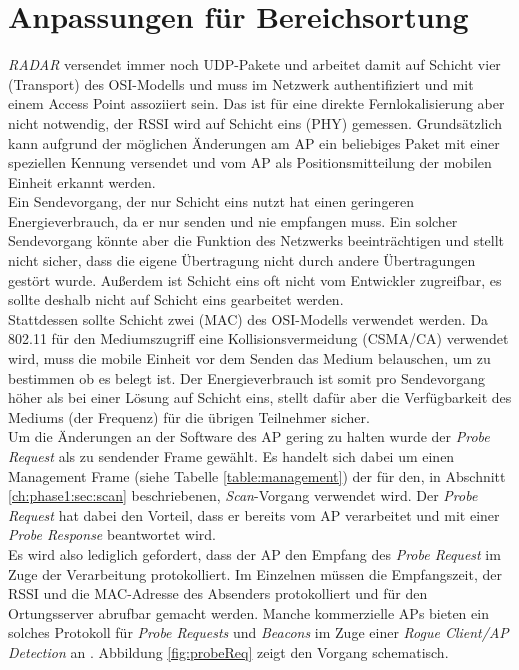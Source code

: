 \section{Anpassungen für Bereichsortung}
\label{ch:phase2:sec:anpassungbereich}
\emph{RADAR} versendet immer noch UDP-Pakete und arbeitet damit auf Schicht vier (Transport) des OSI-Modells und muss im Netzwerk authentifiziert und mit einem Access Point assoziiert sein.
Das ist für eine direkte Fernlokalisierung aber nicht notwendig, der RSSI wird auf Schicht eins (PHY) gemessen.
Grundsätzlich kann aufgrund der möglichen Änderungen am AP ein beliebiges Paket mit einer speziellen Kennung versendet und vom AP als Positionsmitteilung der mobilen Einheit erkannt werden. \\
Ein Sendevorgang, der nur Schicht eins nutzt hat einen geringeren Energieverbrauch, da er nur senden und nie empfangen muss.
Ein solcher Sendevorgang könnte aber die Funktion des Netzwerks beeinträchtigen und stellt nicht sicher, dass die eigene Übertragung nicht durch andere Übertragungen gestört wurde.
Außerdem ist Schicht eins oft nicht vom Entwickler zugreifbar, es sollte deshalb nicht auf Schicht eins gearbeitet werden.\\
Stattdessen sollte Schicht zwei (MAC) des OSI-Modells verwendet werden. 
Da 802.11 für den Mediumszugriff eine Kollisionsvermeidung (CSMA/CA) verwendet wird, muss die mobile Einheit vor dem Senden das Medium belauschen, um zu bestimmen ob es belegt ist.
Der Energieverbrauch ist somit pro Sendevorgang höher als bei einer Lösung auf Schicht eins, stellt dafür aber die Verfügbarkeit des Mediums (der Frequenz) für die übrigen Teilnehmer sicher. \\
Um die Änderungen an der Software des AP gering zu halten wurde der \emph{Probe Request} als zu sendender Frame gewählt.
Es handelt sich dabei um einen Management Frame (siehe Tabelle \ref{table:management}) der für den, in Abschnitt \ref{ch:phase1:sec:scan} beschriebenen, \emph{Scan}-Vorgang verwendet wird.
Der \emph{Probe Request} hat dabei den Vorteil, dass er bereits vom AP verarbeitet und mit einer \emph{Probe Response} beantwortet wird. \\
Es wird also lediglich gefordert, dass der AP den Empfang des \emph{Probe Request} im Zuge der Verarbeitung protokolliert. 
Im Einzelnen müssen die Empfangszeit, der RSSI und die MAC-Adresse des Absenders protokolliert und für den Ortungsserver abrufbar gemacht werden. 
Manche kommerzielle APs bieten ein solches Protokoll für \emph{Probe Requests} und \emph{Beacons} im Zuge einer \textit{Rogue Client/AP Detection} an \cite{lancom2017rouge}.
Abbildung \ref{fig:probeReq} zeigt den Vorgang schematisch.\\


